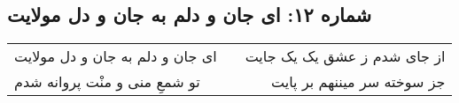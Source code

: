 \begin{center}
\section*{شماره ۱۲: ای جان و دلم به جان و دل مولایت}
\label{sec:012}
\begin{longtable}{l p{0.5cm} r}
ای جان و دلم به جان و دل مولایت
&&
از جای شدم ز عشق یک یک جایت
\\
تو شمعِ منی و منْت پروانه شدم
&&
جز سوخته سر میننهم بر پایت
\\
\end{longtable}
\end{center}
